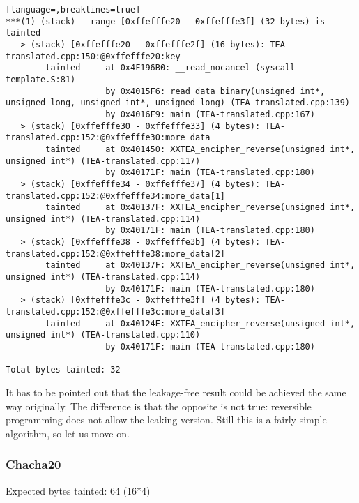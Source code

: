 \documentclass[a4paper,10pt,openright]{memoir}
\begin{document}
\begin{lstlisting}[language=,breaklines=true]
***(1) (stack)	 range [0xffefffe20 - 0xffefffe3f] (32 bytes) is tainted
   > (stack) [0xffefffe20 - 0xffefffe2f] (16 bytes): TEA-translated.cpp:150:@0xffefffe20:key
        tainted     at 0x4F196B0: __read_nocancel (syscall-template.S:81)
                    by 0x4015F6: read_data_binary(unsigned int*, unsigned long, unsigned int*, unsigned long) (TEA-translated.cpp:139)
                    by 0x4016F9: main (TEA-translated.cpp:167)
   > (stack) [0xffefffe30 - 0xffefffe33] (4 bytes): TEA-translated.cpp:152:@0xffefffe30:more_data
        tainted     at 0x401450: XXTEA_encipher_reverse(unsigned int*, unsigned int*) (TEA-translated.cpp:117)
                    by 0x40171F: main (TEA-translated.cpp:180)
   > (stack) [0xffefffe34 - 0xffefffe37] (4 bytes): TEA-translated.cpp:152:@0xffefffe34:more_data[1]
        tainted     at 0x40137F: XXTEA_encipher_reverse(unsigned int*, unsigned int*) (TEA-translated.cpp:114)
                    by 0x40171F: main (TEA-translated.cpp:180)
   > (stack) [0xffefffe38 - 0xffefffe3b] (4 bytes): TEA-translated.cpp:152:@0xffefffe38:more_data[2]
        tainted     at 0x40137F: XXTEA_encipher_reverse(unsigned int*, unsigned int*) (TEA-translated.cpp:114)
                    by 0x40171F: main (TEA-translated.cpp:180)
   > (stack) [0xffefffe3c - 0xffefffe3f] (4 bytes): TEA-translated.cpp:152:@0xffefffe3c:more_data[3]
        tainted     at 0x40124E: XXTEA_encipher_reverse(unsigned int*, unsigned int*) (TEA-translated.cpp:110)
                    by 0x40171F: main (TEA-translated.cpp:180)

Total bytes tainted: 32
\end{lstlisting}

It has to be pointed out that the leakage-free result could be achieved 
the same way originally. The difference is that the opposite is not 
true: reversible programming does not allow the leaking version. Still 
this is a fairly simple algorithm, so let us move on.

\subsubsection{Chacha20}


Expected bytes tainted: 64 (16*4)

\end{document}
